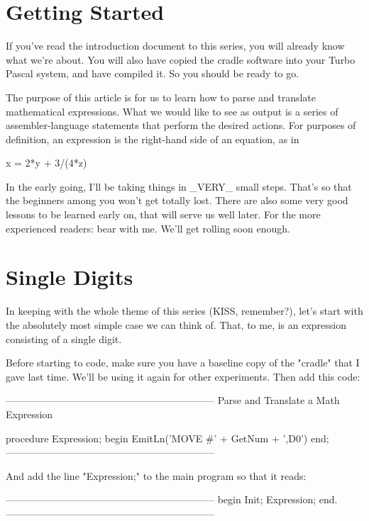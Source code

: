 \documentclass[float=false, crop=false]{standalone}
\begin{document}
\section{Getting Started}

If you've read the introduction document to this series, you will already know
what we're about. You will also have copied the cradle software into your Turbo
Pascal system, and have compiled it. So you should be ready to go.

The purpose of this article is for us to learn how to parse and translate
mathematical expressions. What we would like to see as output is a series of
assembler-language statements that perform the desired actions. For purposes of
definition, an expression is the right-hand side of an equation, as in

               x = 2*y + 3/(4*z)

In the early going, I'll be taking things in _VERY_ small steps. That's so that
the beginners among you won't get totally lost. There are also some very good
lessons to be learned early on, that will serve us well later. For the more
experienced readers: bear with me. We'll get rolling soon enough.

\section{Single Digits}

In keeping with the whole theme of this series (KISS, remember?), let's start
with the absolutely most simple case we can think of. That, to me, is an
expression consisting of a single digit.

Before starting to code, make sure you have a baseline copy of the "cradle" that
I gave last time. We'll be using it again for other experiments. Then add this
code:

\begin{code}
{---------------------------------------------------------------}
{ Parse and Translate a Math Expression }

procedure Expression;
begin
   EmitLn('MOVE #' + GetNum + ',D0')
end;
{---------------------------------------------------------------}
\end{code}

And add the  line  "Expression;"  to  the main program so that it
reads:

\begin{code}
{---------------------------------------------------------------}
begin
   Init;
   Expression;
end.
{---------------------------------------------------------------}
\end{code}
\end{document}
